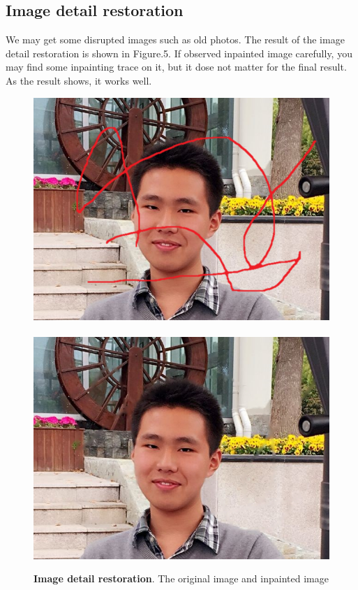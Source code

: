 \subsection*{Image detail restoration}
We may get some disrupted images such as old photos. The result of the image detail restoration is shown in Figure.5. If observed inpainted image carefully, you may find some inpainting trace on it, but it dose not matter for the final result. As the result shows, it works well.
\begin{figure}
	\centering
	\includegraphics[width=0.9\linewidth]{zouyikai.png}\\\ \\
	\includegraphics[width=0.9\linewidth]{zouyikai_result.png}
	\caption{\textbf{Image detail restoration}. The original image and inpainted image}
\end{figure}

